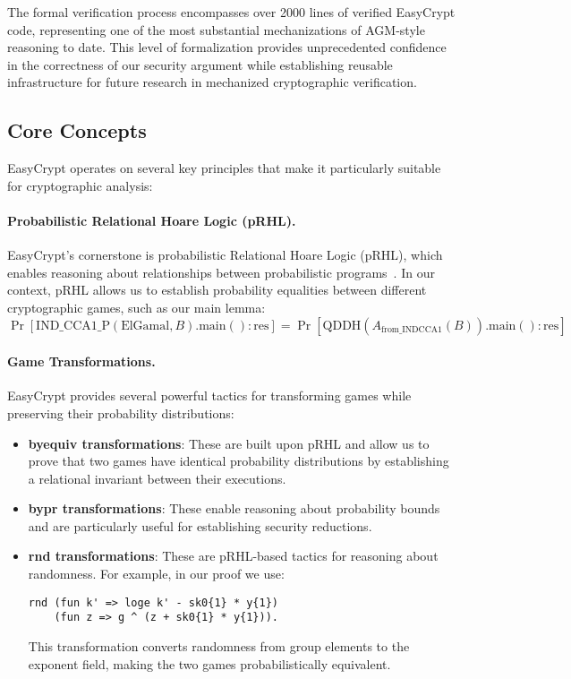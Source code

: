 The formal verification process encompasses over 2000 lines of verified EasyCrypt code, representing one of the most substantial mechanizations of AGM-style reasoning to date. This level of formalization provides unprecedented confidence in the correctness of our security argument while establishing reusable infrastructure for future research in mechanized cryptographic verification.


\subsection{Core Concepts}

EasyCrypt operates on several key principles that make it particularly suitable for cryptographic analysis:

\paragraph{Probabilistic Relational Hoare Logic (pRHL).} EasyCrypt's cornerstone is probabilistic Relational Hoare Logic (pRHL), which enables reasoning about relationships between probabilistic programs~\cite{Bar2012}. In our context, pRHL allows us to establish probability equalities between different cryptographic games, such as our main lemma:
\[
\Pr[\text{IND\_CCA1\_P}(\text{ElGamal}, B).\text{main}() : \text{res}] = \Pr[\text{QDDH}(A_{\text{from\_INDCCA1}}(B)).\text{main}() : \text{res}]
\]

\paragraph{Game Transformations.} EasyCrypt provides several powerful tactics for transforming games while preserving their probability distributions:

\begin{itemize}
\item \textbf{byequiv transformations}: These are built upon pRHL and allow us to prove that two games have identical probability distributions by establishing a relational invariant between their executions.

\item \textbf{bypr transformations}: These enable reasoning about probability bounds and are particularly useful for establishing security reductions.

\item \textbf{rnd transformations}: These are pRHL-based tactics for reasoning about randomness. For example, in our proof we use:
\begin{lstlisting}[style=easycrypt, basicstyle=\footnotesize\ttfamily]
rnd (fun k' => loge k' - sk0{1} * y{1}) 
    (fun z => g ^ (z + sk0{1} * y{1})).
\end{lstlisting}
This transformation converts randomness from group elements to the exponent field, making the two games probabilistically equivalent.
\end{itemize}

